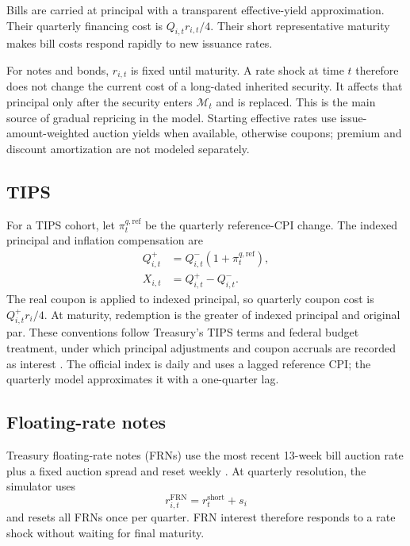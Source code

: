 \documentclass[10pt]{article}
\begin{document}
Bills are carried at principal with a transparent effective-yield approximation.  Their
quarterly financing cost is $Q_{i,t}r_{i,t}/4$.  Their short representative maturity makes
bill costs respond rapidly to new issuance rates.

For notes and bonds, $r_{i,t}$ is fixed until maturity.  A rate shock at time $t$ therefore
does not change the current cost of a long-dated inherited security.  It affects that
principal only after the security enters $\mathcal{M}_t$ and is replaced.  This is the main
source of gradual repricing in the model.  Starting effective rates use issue-amount-weighted
auction yields when available, otherwise coupons; premium and discount amortization are not
modeled separately.

\subsection*{TIPS}

For a TIPS cohort, let $\pi^{q,\mathrm{ref}}_t$ be the quarterly reference-CPI change.  The
indexed principal and inflation compensation are
\begin{align}
 Q_{i,t}^{+}&=Q_{i,t}^{-}(1+\pi^{q,\mathrm{ref}}_t),\\
 X_{i,t}&=Q_{i,t}^{+}-Q_{i,t}^{-}.
\end{align}
The real coupon is applied to indexed principal, so quarterly coupon cost is
$Q_{i,t}^{+}r_i/4$.  At maturity, redemption is the greater of indexed principal and
original par.  These conventions follow Treasury's TIPS terms and federal budget treatment,
under which principal adjustments and coupon accruals are recorded as interest
\cite{tips,cbonetinterest}.  The official index is daily and uses a lagged reference CPI;
the quarterly model approximates it with a one-quarter lag.

\subsection*{Floating-rate notes}

Treasury floating-rate notes (FRNs) use the most recent 13-week bill auction rate plus a
fixed auction spread and reset weekly \cite{frn}.  At quarterly resolution, the simulator
uses
\begin{equation}
 r^{\mathrm{FRN}}_{i,t}=r^{\mathrm{short}}_t+s_i
\end{equation}
and resets all FRNs once per quarter.  FRN interest therefore responds to a rate shock
without waiting for final maturity.
\end{document}
